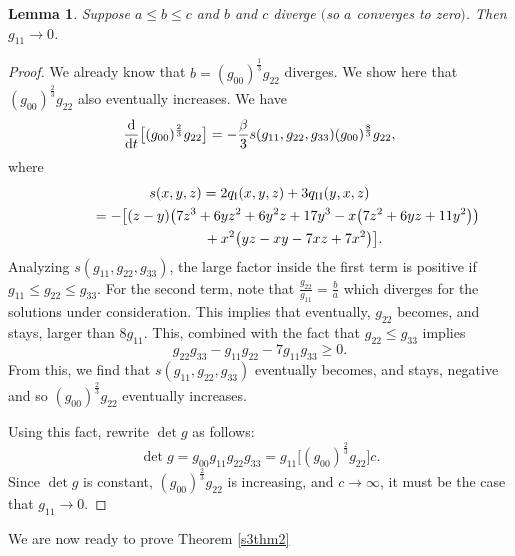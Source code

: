 \documentclass[10pt,a4paper]{amsart}
\numberwithin{equation}{section}
\newtheorem{Lemma}[Theorem]{Lemma}
\newcommand{\dtime}{\frac{{\rm d}}{{\rm d} t}} %
\begin{document}
\begin{Lemma} \label{s3azerobcinfinitylemma2}
Suppose $a \leq b \leq c$ and $b$ and $c$ diverge $($so $a$ converges to zero$)$. Then $g_{11} \rightarrow 0$.
\end{Lemma}

\begin{proof}We already know that $b = (g_{00})^{\frac{1}{3}} g_{22}$ diverges. We show here that $(g_{00})^{\frac{2}{3}} g_{22}$ also eventually increases. We have
\[
\dtime \big[(g_{00})^{\frac{2}{3}} g_{22}\big]
	= -\frac{\beta}{3} s(g_{11}, g_{22}, g_{33}) (g_{00})^{\frac{8}{3}} g_{22},
\]
where
\begin{gather*}
s(x, y, z) = 2 q_{\rm I}(x, y, z) + 3 q_{\rm II}(y, x, z) \\
\hphantom{s(x, y, z)}{} = -\big[(z-y)\big(7z^3 + 6yz^2 + 6y^2z + 17y^3 - x\big(7z^2 + 6yz + 11y^2\big)\big) \\
\hphantom{s(x, y, z) =}{} + x^2\big(yz -xy - 7xz + 7x^2\big)\big].
\end{gather*}
Analyzing $s(g_{11}, g_{22}, g_{33})$, the large factor inside the first term is positive if $g_{11} \leq g_{22} \leq g_{33}$. For the second term, note that $\frac{g_{22}}{g_{11}} = \frac{b}{a}$ which diverges for the solutions under consideration. This implies that eventually, $g_{22}$ becomes, and stays, larger than $8 g_{11}$. This, combined with the fact that $g_{22} \leq g_{33}$ implies
\[
g_{22} g_{33} -g_{11} g_{22} - 7g_{11} g_{33} \geq 0.
\]
From this, we find that $s(g_{11}, g_{22}, g_{33})$ eventually becomes, and stays, negative and so $(g_{00})^{\frac{2}{3}} g_{22}$ eventually increases.

Using this fact, rewrite $\det g$ as follows:
\begin{equation*}
\det g = g_{00} g_{11} g_{22} g_{33}
	= g_{11} \big[(g_{00})^{\frac{2}{3}} g_{22}\big] c.
\end{equation*}
Since $\det g$ is constant, $(g_{00})^{\frac{2}{3}} g_{22}$ is increasing, and $c \rightarrow \infty$, it must be the case that $g_{11} \rightarrow 0$.
\end{proof}

We are now ready to prove Theorem \ref{s3thm2}
\end{document}
